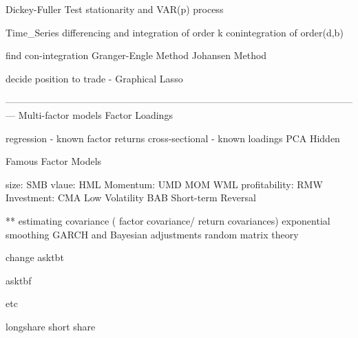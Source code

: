 \documentclass[11pt, openany]{book}              %
\begin{document}
Dickey-Fuller Test 
  stationarity and VAR(p) process

Time_Series
differencing and integration of order k
conintegration of order(d,b)\

find con-integration 
    Granger-Engle Method
     Johansen Method
 
decide position to trade - 
	Graphical Lasso
	
	
	—————————————————————————————————————
Multi-factor models
Factor Loadings

regression  - known factor returns
cross-sectional - known loadings
PCA
Hidden


Famous Factor Models

size: SMB
vlaue: HML
Momentum: UMD MOM WML
profitability: RMW Investment: CMA
Low Volatility  BAB
Short-term Reversal 





** estimating covariance ( factor covariance/ return covariances)
  exponential smoothing
  GARCH and Bayesian adjustments
  random matrix theory



change asktbt

asktbf  

etc

longshare short share

 
\end{document}

